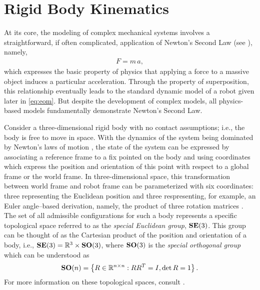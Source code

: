 \section{Rigid Body Kinematics}

At its core, the modeling of complex mechanical systems involves a
straightforward, if often complicated, application of Newton's Second Law (see
\cite{Feynman1964}), namely,
\begin{align*}
  F = m \, a,
\end{align*}
which expresses the basic property of physics that applying a force to a massive
object induces a particular acceleration.
%
Through the property of superposition, this relationship eventually leads to the
standard dynamic model of a robot given later in \eqref{eq:eom}.
%
But despite the development of complex models, all physics-based models
fundamentally demonstrate Newton's Second Law.

Consider a three-dimensional rigid body with no contact assumptions; i.e., the
body is free to move in space.
%
With the dynamics of the system being dominated by Newton's laws of motion
\cite{Feynman1964}, the state of the system can be expressed by associating a
reference frame to a fix pointed on the body and using coordinates which express
the position and orientation of this point with respect to a global frame or the
world frame.
%
In three-dimensional space, this transformation between world frame and robot
frame can be parameterized with six coordinates: three representing the
Euclidean position and three respresenting, for example, an Euler angle--based
derivation, namely, the product of three rotation matrices
\cite[Ch. 7]{Baruh1998}.
%
The set of all admissible configurations for such a body represents a specific
topological space referred to as the {\em special Euclidean group}, $\mathbf{SE}(3)$.
%
This group can be thought of as the Cartesian product of the position and
orientation of a body, i.e., $\mathbf{SE}(3) = \mathbb{R}^3 \times \mathbf{SO}(3)$, where $\mathbf{SO}(3)$ is
the {\em special orthogonal group} which can be understood as
\begin{align*}
  \mathbf{SO}(n) = \left\{ R \in \mathbb{R}^{n \times n} : R R^T = I, \det R = 1 \right\}.
\end{align*}
For more information on these topological spaces, consult
\cite[Ch. 2]{Murray1994}.


